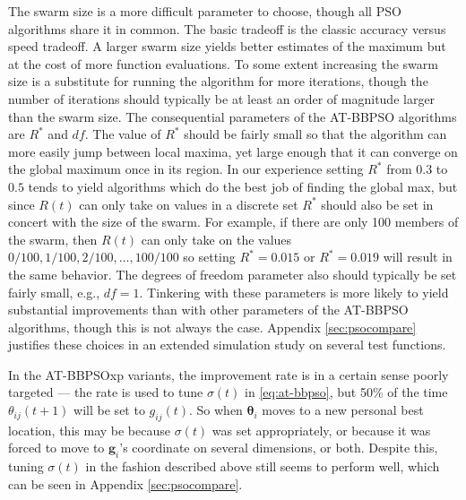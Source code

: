 \documentclass[12pt]{article}
\begin{document}
The swarm size is a more difficult parameter to choose, though all PSO algorithms share it in common. The basic tradeoff is the classic accuracy versus speed tradeoff. A larger swarm size yields better estimates of the maximum but at the cost of more function evaluations. To some extent increasing the swarm size is a substitute for running the algorithm for more iterations, though the number of iterations should typically be at least an order of magnitude larger than the swarm size. The consequential parameters of the AT-BBPSO algorithms are $R^*$ and $df$. The value of $R^*$ should be fairly small so that the algorithm can more easily jump between local maxima, yet large enough that it can converge on the global maximum once in its region. In our experience setting $R^*$ from  $0.3$ to $0.5$ tends to yield algorithms which do the best job of finding the global max, but since $R(t)$ can only take on values in a discrete set $R^*$ should also be set in concert with the size of the swarm. For example, if there are only 100 members of the swarm, then $R(t)$ can only take on the values $0/100, 1/100, 2/100, \dots, 100/100$ so setting $R^*=0.015$ or $R^*=0.019$ will result in the same behavior. The degrees of freedom parameter also should typically be set fairly small, e.g., $df=1$. Tinkering with these parameters is more likely to yield substantial improvements than with other parameters of the AT-BBPSO algorithms, though this is not always the case. Appendix \ref{sec:psocompare} justifies these choices in an extended simulation study on several test functions.

In the AT-BBPSOxp variants, the improvement rate is in a certain sense poorly targeted --- the rate is used to tune $\sigma(t)$ in \eqref{eq:at-bbpso}, but 50\% of the time $\theta_{ij}(t+1)$ will be set to $g_{ij}(t)$. So when $\bm{\theta}_i$ moves to a new personal best location, this may be because $\sigma(t)$ was set appropriately, or because it was forced to move to $\bm{g}_i$'s coordinate on several dimensions, or both. Despite this, tuning $\sigma(t)$ in the fashion described above still seems to perform well, which can be seen in Appendix \ref{sec:psocompare}.
\end{document}
